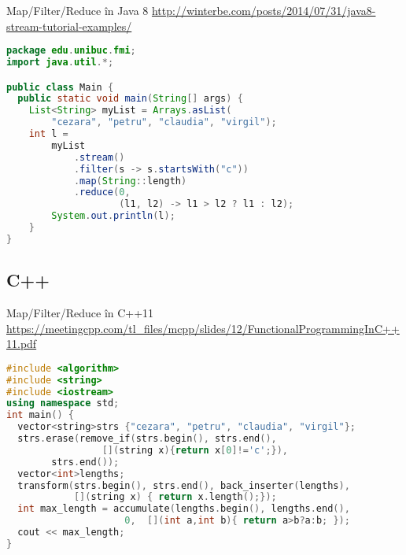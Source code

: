 \documentclass[xcolor=pdftex,romanian,colorlinks]{beamer}
\begin{document}
\begin{frame}[fragile]{Map/Filter/Reduce în Java 8}
{\url{http://winterbe.com/posts/2014/07/31/java8-stream-tutorial-examples/}}
\begin{lstlisting}[language=Java,basicstyle=\small]
package edu.unibuc.fmi;
import java.util.*;

public class Main {
  public static void main(String[] args) {
    List<String> myList = Arrays.asList(
        "cezara", "petru", "claudia", "virgil");
    int l =
        myList
            .stream()
            .filter(s -> s.startsWith("c"))
            .map(String::length)
            .reduce(0,
                    (l1, l2) -> l1 > l2 ? l1 : l2);
        System.out.println(l);
    }
}
\end{lstlisting}
\end{frame}



\subsection{C++}

\begin{frame}[fragile]{Map/Filter/Reduce în C++11}
{\url{https://meetingcpp.com/tl_files/mcpp/slides/12/FunctionalProgrammingInC++11.pdf}}
\begin{lstlisting}[language=C++,basicstyle=\small]
#include <algorithm>
#include <string>
#include <iostream>
using namespace std;
int main() {
  vector<string>strs {"cezara", "petru", "claudia", "virgil"};
  strs.erase(remove_if(strs.begin(), strs.end(),
                 [](string x){return x[0]!='c';}),
        strs.end());
  vector<int>lengths;   
  transform(strs.begin(), strs.end(), back_inserter(lengths), 
            [](string x) { return x.length();});
  int max_length = accumulate(lengths.begin(), lengths.end(),
                     0,  [](int a,int b){ return a>b?a:b; });     
  cout << max_length;
}
\end{lstlisting}
\end{frame}
\end{document}
